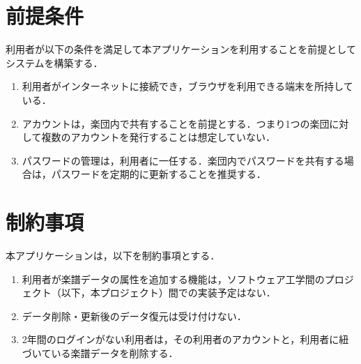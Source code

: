 \section{前提条件}
利用者が以下の条件を満足して本アプリケーションを利用することを前提としてシステムを構築する．
\begin{enumerate}
      \item 利用者がインターネットに接続でき，ブラウザを利用できる端末を所持している．
      \item アカウントは，楽団内で共有することを前提とする．つまり1つの楽団に対して複数のアカウントを発行することは想定していない．
      \item パスワードの管理は，利用者に一任する．楽団内でパスワードを共有する場合は，パスワードを定期的に更新することを推奨する．
\end{enumerate}
\section{制約事項}
本アプリケーションは，以下を制約事項とする．
\begin{enumerate}
      \item 利用者が楽譜データの属性を追加する機能は，ソフトウェア工学間のプロジェクト（以下，本プロジェクト）間での実装予定はない．
      \item データ削除・更新後のデータ復元は受け付けない．
      \item 2年間のログインがない利用者は，その利用者のアカウントと，利用者に紐づいている楽譜データを削除する．
\end{enumerate}